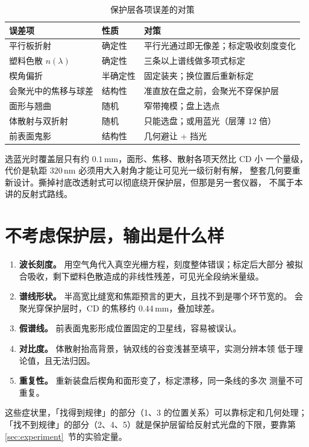 \documentclass[a4paper,11pt]{ctexart}
\begin{document}
\begin{table}[htbp]
\centering
\caption{保护层各项误差的对策}
\label{tab:mitigation}
\begin{tabular}{lll}
\toprule
误差项 & 性质 & 对策 \\
\midrule
平行板折射 & 确定性 & 平行光通过即无像差；标定吸收刻度变化 \\
塑料色散 $n(\lambda)$ & 确定性 & 三条以上谱线做多项式标定 \\
楔角偏折 & 半确定性 & 固定装夹；换位置后重新标定 \\
会聚光中的焦移与球差 & 结构性 & 准直放在盘之前，会聚光不穿保护层 \\
面形与翘曲 & 随机 & 窄带掩模；盘上选点 \\
体散射与双折射 & 随机 & 只能选盘；或用蓝光（层薄 $12$ 倍） \\
前表面鬼影 & 结构性 & 几何避让 + 挡光 \\
\bottomrule
\end{tabular}
\end{table}

选蓝光时覆盖层只有约 $0.1\,\mathrm{mm}$，面形、焦移、散射各项天然比 CD 小
一个量级，代价是轨距 $320\,\mathrm{nm}$ 必须用大入射角才能让可见光一级衍射有解，
整套几何要重新设计。撕掉衬底改透射式可以彻底绕开保护层，但那是另一套仪器，
不属于本讲的反射式路线。

\section{不考虑保护层，输出是什么样}
\label{sec:ignored}

\begin{enumerate}
\item \textbf{波长刻度。} 用空气角代入真空光栅方程，刻度整体错误；标定后大部分
被拟合吸收，剩下塑料色散造成的非线性残差，可见光全段纳米量级。
\item \textbf{谱线形状。} 半高宽比缝宽和焦距预言的更大，且找不到是哪个环节宽的。
会聚光穿保护层时，CD 的焦移约 $0.44\,\mathrm{mm}$，叠加球差。
\item \textbf{假谱线。} 前表面鬼影形成位置固定的卫星线，容易被误认。
\item \textbf{对比度。} 体散射抬高背景，钠双线的谷变浅甚至填平，实测分辨本领
低于理论值，且无法归因。
\item \textbf{重复性。} 重新装盘后楔角和面形变了，标定漂移，同一条线的多次
测量不可重复。
\end{enumerate}

这些症状里，「找得到规律」的部分（1、3 的位置关系）可以靠标定和几何处理；
「找不到规律」的部分（2、4、5）就是保护层留给反射式光盘的下限，要靠第
\ref{sec:experiment}~节的实验定量。
\end{document}
